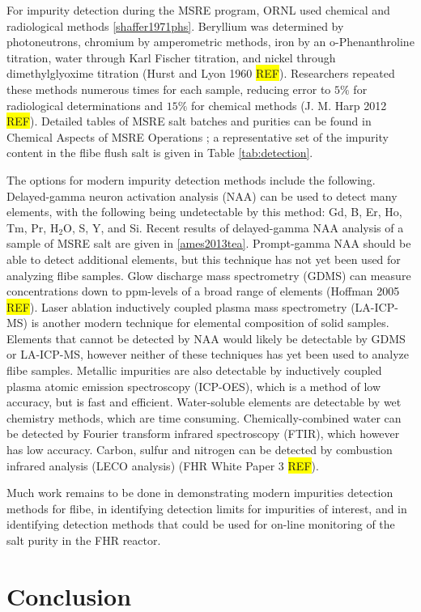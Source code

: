 \documentclass[11pt]{article}
\newcommand{\REF}[0]{\colorbox{yellow}{REF}}
\newcommand{\water}[0]{$\mathrm{H_2O}$}
\begin{document}
For impurity detection during the MSRE program, ORNL used chemical and radiological methods \ref{shaffer1971phs}.
Beryllium was determined by photoneutrons, chromium by amperometric methods, iron by an o-Phenanthroline titration, water through Karl Fischer titration, and nickel through dimethylglyoxime titration (Hurst and Lyon 1960 \REF).
Researchers repeated these methods numerous times for each sample, reducing error to $5\%$ for radiological determinations and $15\%$ for chemical methods (J. M. Harp 2012 \REF).
Detailed tables of MSRE salt batches and purities can be found in Chemical Aspects of MSRE Operations \cite{thoma1971cam}; a representative set of the impurity content in the flibe flush salt is given in Table \ref{tab:detection}.

The options for modern impurity detection methods include the following.
Delayed-gamma neuron activation analysis (NAA) can be used to detect many elements, with the following being undetectable by this method: Gd, B, Er, Ho, Tm, Pr, \water{}, S, Y, and Si.
Recent results of delayed-gamma NAA analysis of a sample of MSRE salt are given in \ref{ames2013tea}.
Prompt-gamma NAA should be able to detect additional elements, but this technique has not yet been used for analyzing flibe samples.
Glow discharge mass spectrometry (GDMS) can measure concentrations down to ppm-levels of a broad range of elements (Hoffman 2005 \REF).
Laser ablation inductively coupled plasma mass spectrometry (LA-ICP-MS) is another modern technique for elemental composition of solid samples.
Elements that cannot be detected by NAA would likely be detectable by GDMS or LA-ICP-MS, however neither of these techniques has yet been used to analyze flibe samples.
Metallic impurities are also detectable by inductively coupled plasma atomic emission spectroscopy (ICP-OES), which is a method of low accuracy, but is fast and efficient.
Water-soluble elements are detectable by wet chemistry methods, which are time consuming.
Chemically-combined water can be detected by Fourier transform infrared spectroscopy (FTIR), which however has low accuracy.
Carbon, sulfur and nitrogen can be detected by combustion infrared analysis (LECO analysis) (FHR White Paper 3 \REF).

Much work remains to be done in demonstrating modern impurities detection methods for flibe, in identifying detection limits for impurities of interest, and in identifying detection methods that could be used for on-line monitoring of the salt purity in the FHR reactor.


\section{Conclusion}
\label{sec:conclusion}
\end{document}
